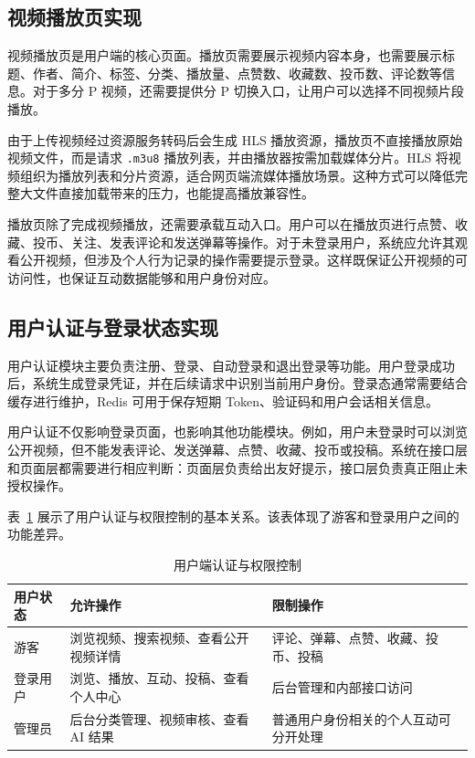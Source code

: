 \subsection{视频播放页实现}
\label{subsec:video-play-implementation}

视频播放页是用户端的核心页面。播放页需要展示视频内容本身，也需要展示标题、作者、简介、标签、分类、播放量、点赞数、收藏数、投币数、评论数等信息。对于多分 P 视频，还需要提供分 P 切换入口，让用户可以选择不同视频片段播放。

由于上传视频经过资源服务转码后会生成 HLS 播放资源，播放页不直接播放原始视频文件，而是请求 \texttt{.m3u8} 播放列表，并由播放器按需加载媒体分片。HLS 将视频组织为播放列表和分片资源，适合网页端流媒体播放场景\cite{rfc8216hls}。这种方式可以降低完整大文件直接加载带来的压力，也能提高播放兼容性。

播放页除了完成视频播放，还需要承载互动入口。用户可以在播放页进行点赞、收藏、投币、关注、发表评论和发送弹幕等操作。对于未登录用户，系统应允许其观看公开视频，但涉及个人行为记录的操作需要提示登录。这样既保证公开视频的可访问性，也保证互动数据能够和用户身份对应。

\subsection{用户认证与登录状态实现}
\label{subsec:user-auth-implementation}

用户认证模块主要负责注册、登录、自动登录和退出登录等功能。用户登录成功后，系统生成登录凭证，并在后续请求中识别当前用户身份。登录态通常需要结合缓存进行维护，Redis 可用于保存短期 Token、验证码和用户会话相关信息\cite{redisdocs}。

用户认证不仅影响登录页面，也影响其他功能模块。例如，用户未登录时可以浏览公开视频，但不能发表评论、发送弹幕、点赞、收藏、投币或投稿。系统在接口层和页面层都需要进行相应判断：页面层负责给出友好提示，接口层负责真正阻止未授权操作。

表~\ref{tab:user-auth-control} 展示了用户认证与权限控制的基本关系。该表体现了游客和登录用户之间的功能差异。

\begin{table}[htbp]
  \centering
  \caption{用户端认证与权限控制}
  \label{tab:user-auth-control}
  \begin{tabular}{p{}p{}p{}}
    \hline
    \textbf{用户状态} & \textbf{允许操作} & \textbf{限制操作} \\
    \hline
    游客 & 浏览视频、搜索视频、查看公开视频详情 & 评论、弹幕、点赞、收藏、投币、投稿 \\
    登录用户 & 浏览、播放、互动、投稿、查看个人中心 & 后台管理和内部接口访问 \\
    管理员 & 后台分类管理、视频审核、查看 AI 结果 & 普通用户身份相关的个人互动可分开处理 \\
    \hline
  \end{tabular}
\end{table}

